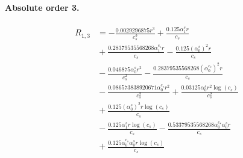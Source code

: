 \documentclass[10pt]{article}
\begin{document}
\paragraph{Absolute order 3.}
\begin{align*}
R_{1,3} &=  - \frac{0.0029296875 r^{3}}{c_{s}^{3}} + \frac{0.125 \alpha_{1}^s r}{c_{s}} \\
&{}  + \frac{0.28379535568268 \alpha_{1}^{c_s} r}{c_{s}} - \frac{0.125 \left(\alpha_{0}^s\right)^{2} r}{c_{s}} \\
&{}  - \frac{0.046875 \alpha_{0}^s r^{2}}{c_{s}^{2}} - \frac{0.28379535568268 \left(\alpha_{0}^{c_s}\right)^{2} r}{c_{s}} \\
&{}  - \frac{0.086573838920671 \alpha_{0}^{c_s} r^{2}}{c_{s}^{2}} + \frac{0.03125 \alpha_{0}^s r^{2} \log{\left(c_{s} \right)}}{c_{s}^{2}} \\
&{}  + \frac{0.125 \left(\alpha_{0}^s\right)^{2} r \log{\left(c_{s} \right)}}{c_{s}} \\
&{}  - \frac{0.125 \alpha_{1}^s r \log{\left(c_{s} \right)}}{c_{s}} - \frac{0.53379535568268 \alpha_{0}^{c_s} \alpha_{0}^s r}{c_{s}} \\
&{}  + \frac{0.125 \alpha_{0}^{c_s} \alpha_{0}^s r \log{\left(c_{s} \right)}}{c_{s}}
\end{align*}
\end{document}
